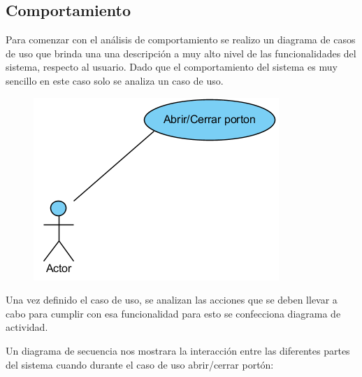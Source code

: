 \documentclass[16pt, article,notitlepage]{article}
\begin{document}
\subsection{Comportamiento}
Para comenzar con el análisis de comportamiento se realizo un diagrama de casos de uso que brinda una una descripción a muy alto nivel de las funcionalidades del sistema, respecto al usuario. Dado que el comportamiento del sistema es muy sencillo en este caso solo se analiza un caso de uso.
\begin{figure}[H]
	\centering 
	{\includegraphics[width=0.3\linewidth]{./images/CasosDeUso.png}}
\end{figure}
Una vez definido el caso de uso, se analizan las acciones que se deben llevar a cabo para cumplir con esa funcionalidad para esto se confecciona diagrama de actividad.
\begin{figure}[H]
\end{figure}
Un diagrama de secuencia nos mostrara la interacción entre las diferentes partes del sistema cuando durante el caso de uso abrir/cerrar portón:
\begin{figure}[H]
\end{figure}
\end{document}

